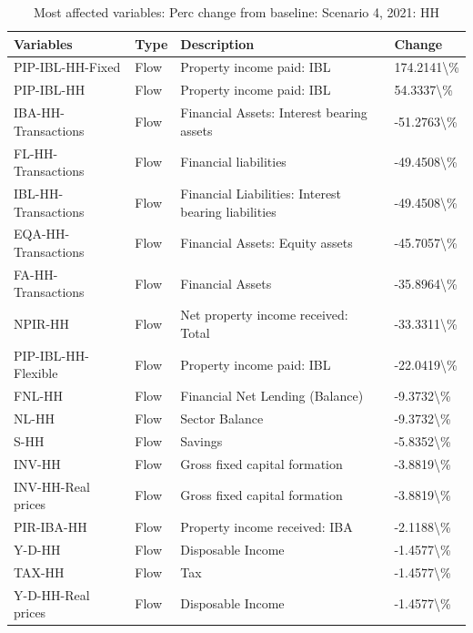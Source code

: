 \documentclass[
]{book}
\begin{document}
\begin{table}

\caption{\label{tab:most-affected-Scenario-4-perc-HH}Most affected variables: Perc change from baseline: Scenario 4, 2021: HH}
\centering
\fontsize{10}{12}\selectfont
\begin{tabular}[t]{l|l|l|l}
\hline
Variables & Type & Description & Change\\
\hline
PIP-IBL-HH-Fixed & Flow & Property income paid: IBL & 174.2141\textbackslash{}\%\\
\hline
PIP-IBL-HH & Flow & Property income paid: IBL & 54.3337\textbackslash{}\%\\
\hline
IBA-HH-Transactions & Flow & Financial Assets: Interest bearing assets & -51.2763\textbackslash{}\%\\
\hline
FL-HH-Transactions & Flow & Financial liabilities & -49.4508\textbackslash{}\%\\
\hline
IBL-HH-Transactions & Flow & Financial Liabilities: Interest bearing liabilities & -49.4508\textbackslash{}\%\\
\hline
EQA-HH-Transactions & Flow & Financial Assets: Equity assets & -45.7057\textbackslash{}\%\\
\hline
FA-HH-Transactions & Flow & Financial Assets & -35.8964\textbackslash{}\%\\
\hline
NPIR-HH & Flow & Net property income received: Total & -33.3311\textbackslash{}\%\\
\hline
PIP-IBL-HH-Flexible & Flow & Property income paid: IBL & -22.0419\textbackslash{}\%\\
\hline
FNL-HH & Flow & Financial Net Lending (Balance) & -9.3732\textbackslash{}\%\\
\hline
NL-HH & Flow & Sector Balance & -9.3732\textbackslash{}\%\\
\hline
S-HH & Flow & Savings & -5.8352\textbackslash{}\%\\
\hline
INV-HH & Flow & Gross fixed capital formation & -3.8819\textbackslash{}\%\\
\hline
INV-HH-Real prices & Flow & Gross fixed capital formation & -3.8819\textbackslash{}\%\\
\hline
PIR-IBA-HH & Flow & Property income received: IBA & -2.1188\textbackslash{}\%\\
\hline
Y-D-HH & Flow & Disposable Income & -1.4577\textbackslash{}\%\\
\hline
TAX-HH & Flow & Tax & -1.4577\textbackslash{}\%\\
\hline
Y-D-HH-Real prices & Flow & Disposable Income & -1.4577\textbackslash{}\%\\

\end{tabular}
\end{table}
\end{document}
